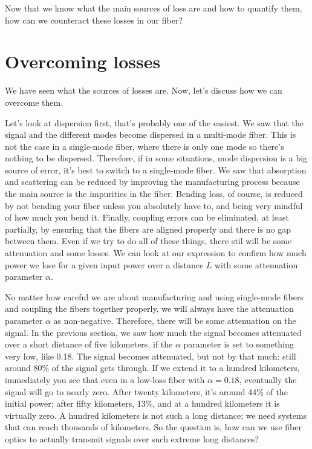Now that we know what the main sources of loss are and how to quantify them, how can we counteract these losses in our fiber?

\section{Overcoming losses}
\label{sec:11-4_overcoming_losses}

We have seen what the sources of losses are. Now, let's discuss how we can overcome them.

Let's look at dispersion first, that's probably one of the easiest. We saw that the signal and the different modes become dispersed in a multi-mode fiber. This is not the case in a single-mode fiber, where there is only one mode so there's nothing to be dispersed. Therefore, if in some situations, mode dispersion is a big source of error, it's best to switch to a single-mode fiber. We saw that absorption and scattering can be reduced by improving the manufacturing process because the main source is the impurities in the fiber. Bending loss, of course, is reduced by not bending your fiber unless you absolutely have to, and being very mindful of how much you bend it. Finally, coupling errors can be eliminated, at least partially, by ensuring that the fibers are aligned properly and there is no gap between them. Even if we try to do all of these things, there stil will be some attenuation and some losses. We can look at  our expression to confirm how much power we lose for a given input power over a distance $L$ with some attenuation parameter $\alpha$.

No matter how careful we are about manufacturing and using single-mode fibers and coupling the fibers together properly, we will always have the attenuation parameter $\alpha$ as non-negative. Therefore, there will be some attenuation on the signal. In the previous section, we saw how much the signal becomes attenuated over a short distance of five kilometers, if the $\alpha$ parameter is set to something very low, like 0.18. The signal becomes attenuated, but not by that much: still around 80\% of the signal gets through. If we extend it to a hundred kilometers, immediately you see that even in a low-loss fiber with $\alpha = 0.18$, eventually the signal will go to nearly zero. After twenty kilometers, it's around 44\% of the initial power; after  fifty kilometers, 13\%, and at a hundred kilometers it is virtually zero. A hundred kilometers is not such a long distance; we need systems that can reach thousands of kilometers. So the question is, how can we use fiber optics to actually transmit signals over such extreme long distances?

